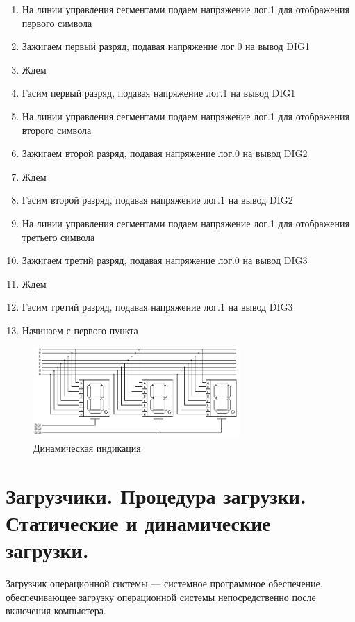 \documentclass[unicode, 12pt, a4paper, oneside]{article}
\begin{document}
\begin{enumerate}
\item На линии управления сегментами подаем напряжение лог.1 для отображения первого символа
\item Зажигаем первый разряд, подавая напряжение лог.0 на вывод DIG1
\item Ждем
\item Гасим первый разряд, подавая напряжение лог.1 на вывод DIG1
\item На линии управления сегментами подаем напряжение лог.1 для отображения второго символа
\item Зажигаем второй разряд, подавая напряжение лог.0 на вывод DIG2
\item Ждем
\item Гасим второй разряд, подавая напряжение лог.1 на вывод DIG2
\item На линии управления сегментами подаем напряжение лог.1 для отображения третьего символа
\item Зажигаем третий разряд, подавая напряжение лог.0 на вывод DIG3
\item Ждем
\item Гасим третий разряд, подавая напряжение лог.1 на вывод DIG3
\item Начинаем с первого пункта  
\end{enumerate}

\begin{figure}[H]
\centering
\includegraphics[width=0.7\textwidth]{158_Indi.png}
\caption{Динамическая индикация}
\end{figure}

\section{Загрузчики. Процедура загрузки. Статические и динамические загрузки.}

Загрузчик операционной системы — системное программное обеспечение, обеспечивающее загрузку операционной системы непосредственно после включения компьютера.
\end{document}
